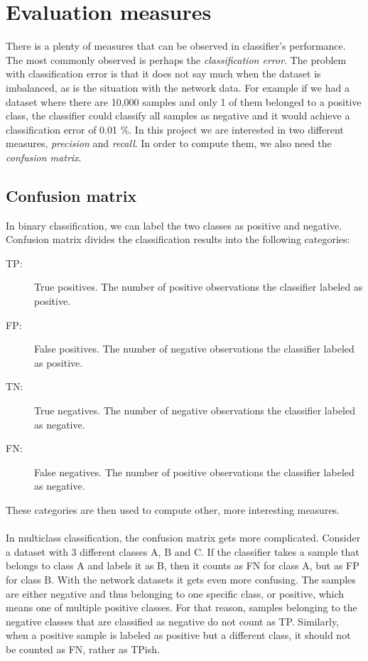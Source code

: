 \documentclass{article}
\begin{document}
  \section{Evaluation measures}
    There is a plenty of measures that can be observed in classifier's performance. The most commonly observed is perhaps the {\it classification error}. The problem with classification error is that it does not say much when the dataset is imbalanced, as is the situation with the network data. For example if we had a dataset where there are 10,000 samples and only 1 of them belonged to a positive class, the classifier could classify all samples as negative and it would achieve a classification error of 0.01 \%. In this project we are interested in two different measures, {\it precision} and {\it recall}. In order to compute them, we also need the {\it confusion matrix}.
    \subsection{Confusion matrix}
      In binary classification, we can label the two classes as positive and negative. Confusion matrix divides the classification results into the following categories:
      \begin{description}
      \item [TP:] True positives. The number of positive observations the classifier labeled as positive.
      \item [FP:] False positives. The number of negative observations the classifier labeled as positive.
      \item [TN:] True negatives. The number of negative observations the classifier labeled as negative.
      \item [FN:] False negatives. The number of positive observations the classifier labeled as negative.
      \end{description}
      These categories are then used to compute other, more interesting measures.
      \\~\\
      In multiclass classification, the confusion matrix gets more complicated. Consider a dataset with 3 different classes A, B and C. If the classifier takes a sample that belongs to class A and labels it as B, then it counts as FN for class A, but as FP for class B. With the network datasets it gets even more confusing. The samples are either negative and thus belonging to one specific class, or positive, which means one of multiple positive classes. For that reason, samples belonging to the negative classes that are classified as negative do not count as TP. Similarly, when a positive sample is labeled as positive but a different class, it should not be counted as FN, rather as TPish.
\end{document}
